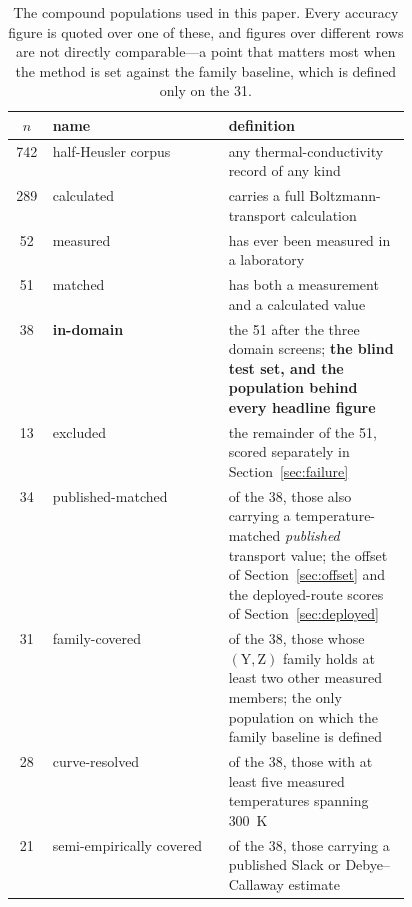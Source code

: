 \begin{table}[tp]
  \centering
  \caption{The compound populations used in this paper. Every accuracy figure is quoted over one of
  these, and figures over different rows are not directly comparable---a point that matters most
  when the method is set against the family baseline, which is defined only on the \num{31}.}
  \label{tab:populations}
  \begin{tabular}{clp{0.46\linewidth}}
    \toprule
    $n$ & name & definition \\
    \midrule
    \num{742} & half-Heusler corpus & any thermal-conductivity record of any kind \\
    \num{289} & calculated & carries a full Boltzmann-transport calculation \\
    \num{52}  & measured & has ever been measured in a laboratory \\
    \midrule
    \num{51}  & matched & has both a measurement and a calculated value \\
    \num{38}  & \textbf{in-domain} & the \num{51} after the three domain screens; \textbf{the blind
                test set, and the population behind every headline figure} \\
    \num{13}  & excluded & the remainder of the \num{51}, scored separately in
                Section~\ref{sec:failure} \\
    \midrule
    \num{34}  & published-matched & of the \num{38}, those also carrying a temperature-matched
                \emph{published} transport value; the offset of Section~\ref{sec:offset} and the
                deployed-route scores of Section~\ref{sec:deployed} \\
    \num{31}  & family-covered & of the \num{38}, those whose $(\mathrm{Y},\mathrm{Z})$ family holds
                at least two other measured members; the only population on which the family
                baseline is defined \\
    \num{28}  & curve-resolved & of the \num{38}, those with at least five measured temperatures
                spanning \SI{300}{\kelvin} \\
    \num{21}  & semi-empirically covered & of the \num{38}, those carrying a published Slack or
                Debye--Callaway estimate \\
    \bottomrule
  \end{tabular}
\end{table}

